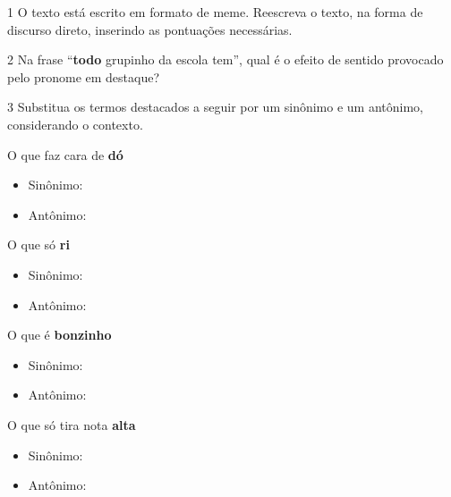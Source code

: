 \num{1} O texto está escrito em formato de meme. Reescreva o texto, na
forma de discurso direto, inserindo as pontuações necessárias.


\num{2} Na frase ``\textbf{todo} grupinho da escola tem'', qual é o
efeito de sentido provocado pelo pronome em destaque?


\num{3} Substitua os termos destacados a seguir por um sinônimo e um
antônimo, considerando o contexto.

\begin{escolha}
\item O que faz cara de \textbf{dó}
\begin{itemize}
\item Sinônimo: 
\item Antônimo: 
\end{itemize}

\item O que só \textbf{ri}
\begin{itemize}
\item Sinônimo: 
\item Antônimo: 
\end{itemize}

\item O que é \textbf{bonzinho}
\begin{itemize}
\item Sinônimo: 
\item Antônimo: 
\end{itemize}

\item O que só tira nota \textbf{alta}
\begin{itemize}
\item Sinônimo: 
\item Antônimo: 
\end{itemize}
\end{escolha}

